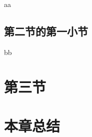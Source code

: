 aa

\subsection{第二节的第一小节}

bb

\section{第三节}

\section{本章总结}

\ifprint
	\newpage
	\thispagestyle{empty}
	\mbox{}
	
	\clearpage
	\setcounter{page}{10}
\fi